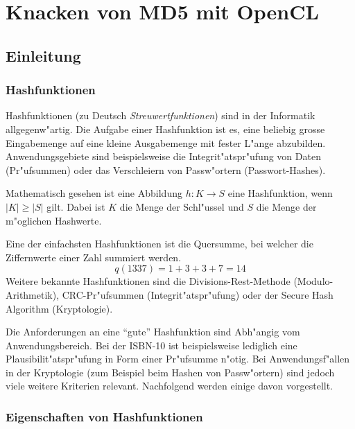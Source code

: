\chapter{Knacken von MD5 mit OpenCL}
\begin{refsection}


\section{Einleitung}


\subsection{Hashfunktionen}

Hashfunktionen (zu Deutsch \textit{Streuwertfunktionen}) sind in der Informatik
allgegenw"artig. Die Aufgabe einer Hashfunktion ist es, eine beliebig grosse
Eingabemenge auf eine kleine Ausgabemenge mit fester L"ange abzubilden.
Anwendungsgebiete sind beispielsweise die Integrit"atspr"ufung von Daten
(Pr"ufsummen) oder das Verschleiern von Passw"ortern (Passwort-Hashes).

Mathematisch gesehen ist eine Abbildung $h: K \rightarrow S$ eine Hashfunktion,
wenn $|K| \geq |S|$ gilt. Dabei ist $K$ die Menge der Schl"ussel und $S$ die
Menge der m"oglichen Hashwerte.

Eine der einfachsten Hashfunktionen ist die Quersumme, bei welcher die
Ziffernwerte einer Zahl summiert werden.
\[
	q(1337) = 1 + 3 + 3 + 7 = 14
\]
Weitere bekannte Hashfunktionen sind die Divisions-Rest-Methode
(Modulo-Arithmetik), CRC-Pr"ufsummen (Integrit"atspr"ufung) oder der Secure Hash
Algorithm (Kryptologie).

Die Anforderungen an eine ``gute'' Hashfunktion sind Abh"angig vom
Anwendungsbereich. Bei der ISBN-10 ist beispielsweise lediglich eine
Plausibilit"atspr"ufung in Form einer Pr"ufsumme n"otig. Bei Anwendungsf"allen
in der Kryptologie (zum Beispiel beim Hashen von Passw"ortern) sind jedoch viele
weitere Kriterien relevant. Nachfolgend werden einige davon vorgestellt.

\subsection{Eigenschaften von Hashfunktionen}


\end{refsection}
